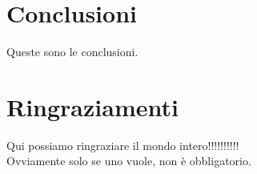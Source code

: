 \documentclass[12pt,a4paper,openright,twoside]{report}
\begin{document}



{}


\clearpage{\pagestyle{empty}\cleardoublepage}
\chapter*{Conclusioni}

 Queste sono le conclusioni.\\

\clearpage{\pagestyle{empty}\cleardoublepage}




\rhead[\fancyplain{}{\bfseries \leftmark}]{\fancyplain{}{\bfseries
\thepage}}

\clearpage{\pagestyle{empty}\cleardoublepage}
\chapter*{Ringraziamenti}
\thispagestyle{empty}
Qui possiamo ringraziare il mondo intero!!!!!!!!!!\\
Ovviamente solo se uno vuole, non \`e obbligatorio.
\nocite{*}


\end{document}
